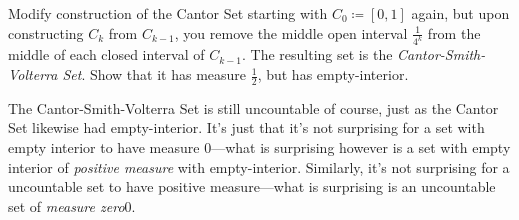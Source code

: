 \begin{exm}\label{CantorSmithVolterraSet}
\begin{exr}
Modify construction of the Cantor Set starting with $C_0\coloneqq [0,1]$ again, but upon constructing $C_k$ from $C_{k-1}$, you remove the middle open interval $\frac{1}{4^k}$ from the middle of each closed interval of $C_{k-1}$.  The resulting set is the \emph{Cantor-Smith-Volterra Set}.  Show that it has measure $\frac{1}{2}$, but has empty-interior.
\end{exr}
\begin{rmk}
The Cantor-Smith-Volterra Set is still uncountable of course, just as the Cantor Set likewise had empty-interior.  It's just that it's not surprising for a set with empty interior to have measure $0$---what is surprising however is a set with empty interior of \emph{positive measure} with empty-interior.  Similarly, it's not surprising for a uncountable set to have positive measure---what is surprising is an uncountable set of \emph{measure zero}0.
\end{rmk}
\end{exm}
